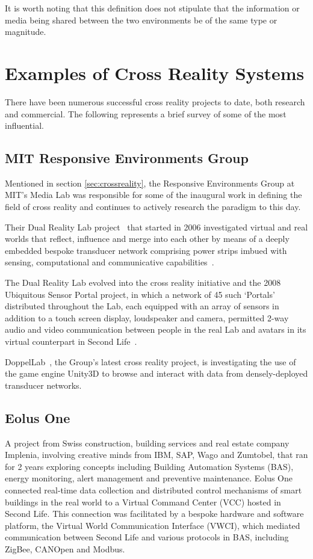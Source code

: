 \documentclass{sig-alternate}
\begin{document}
It is worth noting that this definition does not stipulate that the information or media being shared between the two environments be of the same type or magnitude.

{\section{Examples of Cross Reality Systems}
There have been numerous successful cross reality projects to date, both research and commercial. The following represents a brief survey of some of the most influential.

\subsection{MIT Responsive Environments Group~\cite{MIT}}
Mentioned in section \ref{sec:crossreality}, the Responsive Environments Group at MIT's Media Lab was responsible for some of the inaugural work in defining the field of cross reality and continues to actively research the paradigm to this day.
	
	Their Dual Reality Lab project~\cite{Lifton2007a, lifton:merging} that started in 2006 investigated virtual and real worlds that reflect, influence and merge into each other by means of a deeply embedded bespoke transducer network comprising power strips imbued with sensing, computational and communicative capabilities~\cite{Lifton2007b}.
	
	The Dual Reality Lab evolved into the cross reality initiative and the 2008 Ubiquitous Sensor Portal project, in which a network of 45 such `Portals' distributed throughout the Lab, each equipped with an array of sensors in addition to a touch screen display, loudspeaker and camera, permitted 2-way audio and video communication between people in the real Lab and avatars in its virtual counterpart in Second Life~\cite{Lifton2009}.
	
	DoppelLab~\cite{mit:doppel}, the Group's latest cross reality project, is investigating the use of the game engine Unity3D to browse and interact with data from densely-deployed transducer networks.	
	
\subsection{Eolus One~\cite{Coleman2009, UgoTrade2007}}
A project from Swiss construction, building services and real estate company Implenia, involving creative minds from  IBM, SAP, Wago and Zumtobel, that ran for 2 years exploring concepts including Building Automation Systems (BAS), energy monitoring, alert management and preventive maintenance. Eolus One connected real-time data collection and distributed control mechanisms of smart buildings in the real world to a Virtual Command Center (VCC) hosted in Second Life. This connection was facilitated by a bespoke hardware and software platform, the Virtual World Communication Interface (VWCI), which mediated communication between Second Life and various protocols in BAS, including ZigBee, CANOpen and Modbus.

}
\end{document}
